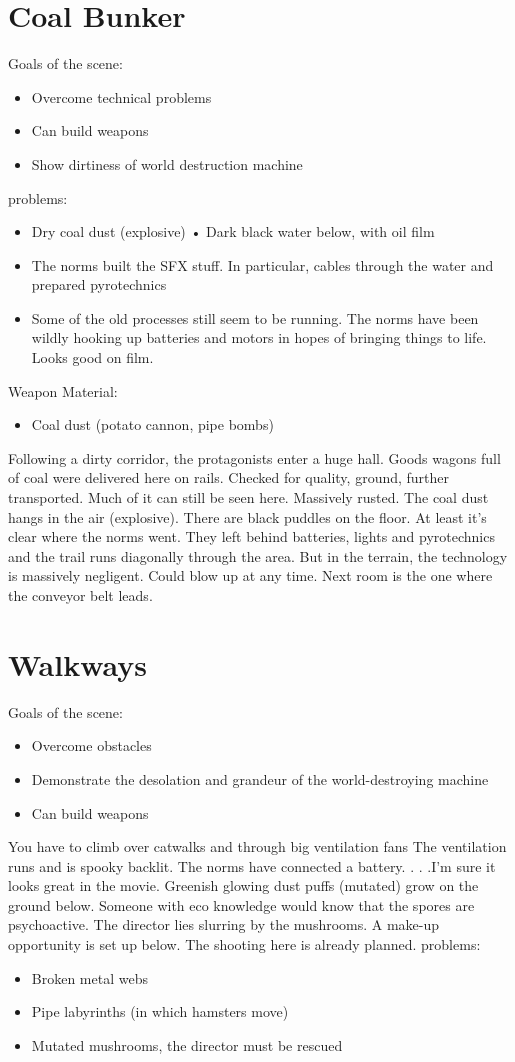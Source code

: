 \section{Coal Bunker}
Goals of the scene:
\begin{itemize}
\item Overcome technical problems
\item Can build weapons
\item Show dirtiness of world destruction machine
\end{itemize}
problems:
\begin{itemize}
\item Dry coal dust (explosive) • Dark black
water below, with oil film
\item The norms built the SFX stuff. In particular, cables through the water and prepared pyrotechnics
\item Some of the old processes still seem to be running. The norms have been wildly hooking up batteries and motors in hopes of bringing
things to life. Looks good on film.
\end{itemize}
Weapon Material:
\begin{itemize}
\item Coal dust (potato cannon, pipe bombs)
\end{itemize}
Following a dirty corridor, the protagonists enter a huge hall. Goods wagons full of coal were delivered here on rails. Checked for quality,
ground, further transported. Much of it can still be seen here.
Massively rusted. The coal dust hangs in the air (explosive). There are black puddles on the floor.
At least it's clear where the norms went. They left behind batteries, lights and pyrotechnics and the trail runs diagonally through the area. But
in the terrain, the technology is massively negligent. Could blow up at any time.
Next room is the one where the conveyor belt leads.

\section{Walkways}
Goals of the scene:
\begin{itemize}
\item Overcome obstacles
\item Demonstrate the desolation and grandeur of the world-destroying machine
\item Can build weapons
\end{itemize}
You have to climb over catwalks and through big ventilation fans
The ventilation runs and is spooky backlit. The norms have connected a battery. . . .I'm sure it looks great in the movie.
Greenish glowing dust puffs (mutated) grow on the ground below. Someone with eco knowledge would know that the spores are psychoactive.
The director lies slurring by the mushrooms.
A make-up opportunity is set up below. The shooting here is already planned.
problems:
\begin{itemize}
\item Broken metal webs
\item Pipe labyrinths (in which hamsters move)
\item Mutated mushrooms, the director must be rescued 
\end{itemize}

